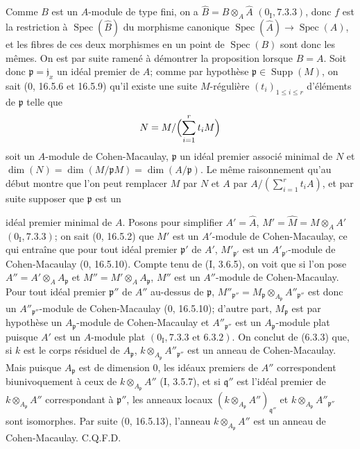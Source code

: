 Comme $B$ est un $A$-module de type fini, on a
$\widehat B=B\otimes_A\widehat A$ $(0_{\mathrm I}, 7.3.3)$, donc $f$ est la
restriction à $\operatorname{Spec}(\widehat B)$ du morphisme canonique
$\operatorname{Spec}(\widehat A)\to\operatorname{Spec}(A)$, et les fibres de
ces deux morphismes en un point de $\operatorname{Spec}(B)$ sont donc les
mêmes. On est par suite ramené à démontrer la proposition lorsque $B=A$.
Soit donc $\mathfrak p=\mathfrak j_x$ un idéal premier de $A$; comme par
hypothèse $\mathfrak p\in\operatorname{Supp}(M)$, on sait (0, 16.5.6 et
16.5.9) qu'il existe une suite $M$-régulière $(t_i)_{1\leq i\leq r}$
d'éléments de $\mathfrak p$ telle que
\[
N=M/\Bigl(\sum_{i=1}^{r}t_iM\Bigr)
\]
soit un $A$-module de Cohen-Macaulay, $\mathfrak p$ un idéal premier associé
minimal de $N$ et
$\dim(N)=\dim(M/\mathfrak pM)=\dim(A/\mathfrak p)$. Le même raisonnement
qu'au début montre que l'on peut remplacer $M$ par $N$ et $A$ par
$A/(\sum_{i=1}^{r}t_iA)$, et par suite supposer que $\mathfrak p$ est un


idéal premier minimal de $A$. Posons pour simplifier
$A'=\widehat A$, $M'=\widehat M=M\otimes_AA'$ $(0_{\mathrm I}, 7.3.3)$; on
sait (0, 16.5.2) que $M'$ est un $A'$-module de Cohen-Macaulay, ce qui entraîne
que pour tout idéal premier $\mathfrak p'$ de $A'$,
$M'_{\mathfrak p'}$ est un $A'_{\mathfrak p'}$-module de Cohen-Macaulay
(0, 16.5.10). Compte tenu de (I, 3.6.5), on voit que si l'on pose
$A''=A'\otimes_AA_{\mathfrak p}$ et
$M''=M'\otimes_AA_{\mathfrak p}$, $M''$ est un $A''$-module de
Cohen-Macaulay. Pour tout idéal premier $\mathfrak p''$ de $A''$ au-dessus
de $\mathfrak p$,
$M''_{\mathfrak p''}=M_{\mathfrak p}\otimes_{A_{\mathfrak p}}
A''_{\mathfrak p''}$ est donc un $A''_{\mathfrak p''}$-module de
Cohen-Macaulay (0, 16.5.10); d'autre part, $M_{\mathfrak p}$ est par hypothèse
un $A_{\mathfrak p}$-module de Cohen-Macaulay et
$A''_{\mathfrak p''}$ est un $A_{\mathfrak p}$-module plat puisque $A'$ est
un $A$-module plat $(0_{\mathrm I}, 7.3.3\text{ et }6.3.2)$. On conclut de (6.3.3)
que, si $k$ est le corps résiduel de $A_{\mathfrak p}$,
$k\otimes_{A_{\mathfrak p}}A''_{\mathfrak p''}$ est un anneau de
Cohen-Macaulay. Mais puisque $A_{\mathfrak p}$ est de dimension $0$, les
idéaux premiers de $A''$ correspondent biunivoquement à ceux de
$k\otimes_{A_{\mathfrak p}}A''$ (I, 3.5.7), et si $\mathfrak q''$ est l'idéal
premier de $k\otimes_{A_{\mathfrak p}}A''$ correspondant à
$\mathfrak p''$, les anneaux locaux
$(k\otimes_{A_{\mathfrak p}}A'')_{\mathfrak q''}$ et
$k\otimes_{A_{\mathfrak p}}A''_{\mathfrak p''}$ sont isomorphes. Par suite
(0, 16.5.13), l'anneau $k\otimes_{A_{\mathfrak p}}A''$ est un anneau de
Cohen-Macaulay. C.Q.F.D.

